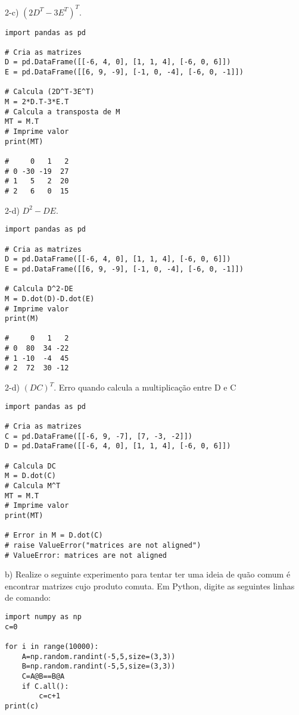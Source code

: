 2-c) $(2D^T-3E^T)^T$.
\\

\begin{lstlisting}
import pandas as pd

# Cria as matrizes
D = pd.DataFrame([[-6, 4, 0], [1, 1, 4], [-6, 0, 6]])
E = pd.DataFrame([[6, 9, -9], [-1, 0, -4], [-6, 0, -1]])
    
# Calcula (2D^T-3E^T)
M = 2*D.T-3*E.T
# Calcula a transposta de M
MT = M.T
# Imprime valor
print(MT)
    
#     0   1   2
# 0 -30 -19  27
# 1   5   2  20
# 2   6   0  15
\end{lstlisting}


2-d) $D^2-DE$.
\\

\begin{lstlisting}
import pandas as pd

# Cria as matrizes
D = pd.DataFrame([[-6, 4, 0], [1, 1, 4], [-6, 0, 6]])
E = pd.DataFrame([[6, 9, -9], [-1, 0, -4], [-6, 0, -1]])
    
# Calcula D^2-DE
M = D.dot(D)-D.dot(E)
# Imprime valor
print(M)
    
#     0   1   2
# 0  80  34 -22
# 1 -10  -4  45
# 2  72  30 -12
\end{lstlisting}


2-d) $(DC)^T$. Erro quando calcula a multiplicação entre D e C
\\

\begin{lstlisting}
import pandas as pd

# Cria as matrizes
C = pd.DataFrame([[-6, 9, -7], [7, -3, -2]])
D = pd.DataFrame([[-6, 4, 0], [1, 1, 4], [-6, 0, 6]])

# Calcula DC
M = D.dot(C)
# Calcula M^T
MT = M.T
# Imprime valor
print(MT)

# Error in M = D.dot(C)
# raise ValueError("matrices are not aligned")
# ValueError: matrices are not aligned
\end{lstlisting}


b) Realize o seguinte experimento para tentar ter uma ideia de quão comum é encontrar matrizes cujo produto comuta. Em Python, digite as seguintes linhas de comando:
\\

\begin{lstlisting}
import numpy as np
c=0

for i in range(10000):
    A=np.random.randint(-5,5,size=(3,3))
    B=np.random.randint(-5,5,size=(3,3))
    C=A@B==B@A
    if C.all():
        c=c+1
print(c)    
\end{lstlisting}


